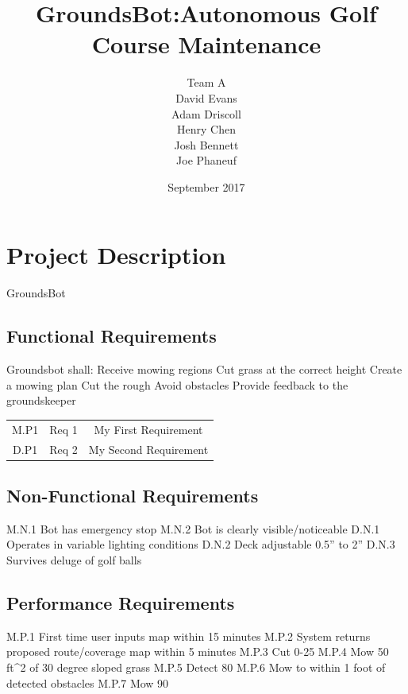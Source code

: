 \documentclass{article}
\begin{document}
\title{GroundsBot:Autonomous Golf Course Maintenance}
\date{September 2017}
\author{Team A        \\ David Evans \\
        Adam Driscoll \\ Henry Chen  \\
        Josh Bennett  \\ Joe Phaneuf \\ }
\maketitle
\newpage

\tableofcontents
\newpage

\section{Project Description}
GroundsBot \\
\subsection{Functional Requirements}
Groundsbot shall:
  Receive mowing regions
  Cut grass at the correct height
  Create a mowing plan
  Cut the rough 
  Avoid obstacles
  Provide feedback to the groundskeeper
\begin{center}
\begin{tabular}{ |c|c|c| }
  \hline
    M.P1 & Req 1 & My First Requirement \\
    D.P1 & Req 2 & My Second Requirement \\
  \hline
\end{tabular}
\end{center}

\subsection{Non-Functional Requirements}
M.N.1 Bot has emergency stop
M.N.2 Bot is clearly visible/noticeable
D.N.1 Operates in variable lighting conditions
D.N.2 Deck adjustable 0.5” to 2”
D.N.3 Survives deluge of golf balls


\subsection{Performance Requirements}
M.P.1 First time user inputs map within 15 minutes
M.P.2 System returns proposed route/coverage map within 5 minutes
M.P.3 Cut 0-25%
M.P.4 Mow 50 ft^2 of 30 degree sloped grass
M.P.5 Detect 80%
M.P.6 Mow to within 1 foot of detected obstacles
M.P.7 Mow 90%
\end{document}
